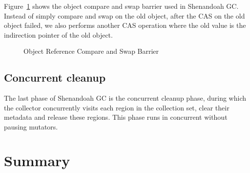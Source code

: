 Figure~\ref{fig:objectcasbarrier} shows the object compare and swap barrier used in Shenandoah GC.
Instead of simply compare and swap on the old object, after the CAS on the old object failed,
we also performs another CAS operation where the old value is the indirection pointer of the old object.

\begin{figure}
  \centering
  
  \caption{Object Reference Compare and Swap Barrier} 
  \label{fig:objectcasbarrier}
\end{figure}

\subsection{Concurrent cleanup}

The last phase of Shenandoah GC is the concurrent cleanup phase, during which the
collector concurrently visits each region in the collection set, clear their metadata
and release these regions. This phase runs in concurrent without pausing mutators.



\section{Summary}


